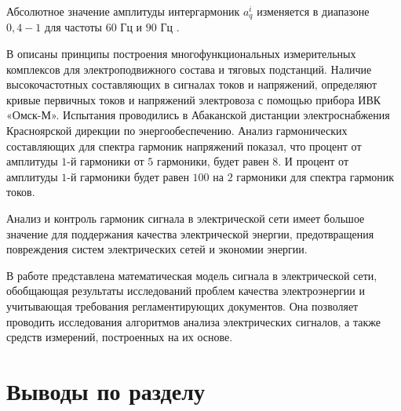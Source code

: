 Абсолютное значение амплитуды интергармоник $a_q^i$ изменяется в диапазоне $0,4-1$ для частоты $60$ Гц и $90$ Гц \cite{testa2007интергармоники}.

В \cite{Improving_methods_Shizma_2014, ramos2017power}описаны принципы построения многофункциональных измерительных комплексов для электроподвижного состава и тяговых подстанций.
Наличие высокочастотных составляющих в сигналах токов и напряжений, определяют кривые первичных токов и напряжений электровоза с помощью прибора ИВК «Омск-М». Испытания проводились в Абаканской дистанции электроснабжения Красноярской дирекции по энергообеспечению. Анализ гармонических составляющих для спектра гармоник напряжений показал, что процент от амплитуды $1$-й гармоники от $5$ гармоники, будет равен $8$. И процент от амплитуды $1$-й гармоники будет равен $100$ на $2$ гармоники для спектра гармоник токов.

Анализ и контроль гармоник сигнала в электрической сети имеет большое значение для поддержания качества электрической энергии, предотвращения повреждения систем электрических сетей и экономии энергии. 

В работе представлена математическая модель сигнала в электрической сети, обобщающая результаты исследований проблем качества электроэнергии и учитывающая требования регламентирующих документов. Она позволяет проводить исследования алгоритмов анализа электрических сигналов, а также средств измерений, построенных на их основе.

\section{Выводы по разделу} \label{sec:ch1/sec6} 

